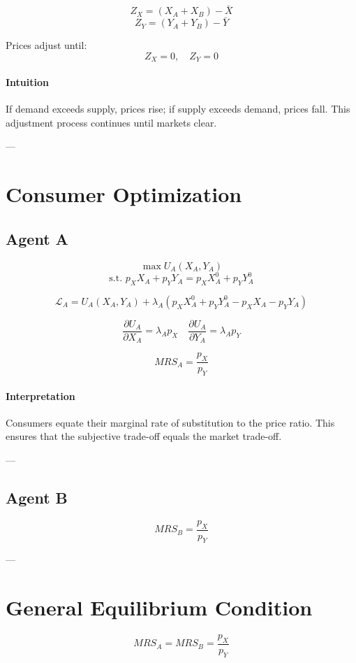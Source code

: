 \[
Z_X = (X_A + X_B) - \bar{X}
\]
\[
Z_Y = (Y_A + Y_B) - \bar{Y}
\]

Prices adjust until:
\[
Z_X = 0, \quad Z_Y = 0
\]

\paragraph{Intuition}
If demand exceeds supply, prices rise; if supply exceeds demand, prices fall.  
This adjustment process continues until markets clear.

---

\section{Consumer Optimization}

\subsection{Agent A}

\[
\max U_A(X_A, Y_A)
\]
\[
\text{s.t. } p_X X_A + p_Y Y_A = p_X X_A^0 + p_Y Y_A^0
\]

\[
\mathcal{L}_A =
U_A(X_A, Y_A)
+ \lambda_A (p_X X_A^0 + p_Y Y_A^0 - p_X X_A - p_Y Y_A)
\]

\[
\frac{\partial U_A}{\partial X_A} = \lambda_A p_X
\quad
\frac{\partial U_A}{\partial Y_A} = \lambda_A p_Y
\]

\[
MRS_A = \frac{p_X}{p_Y}
\]

\paragraph{Interpretation}
Consumers equate their marginal rate of substitution to the price ratio.  
This ensures that the subjective trade-off equals the market trade-off.

---

\subsection{Agent B}

\[
MRS_B = \frac{p_X}{p_Y}
\]

---

\section{General Equilibrium Condition}

\[
MRS_A = MRS_B = \frac{p_X}{p_Y}
\]

